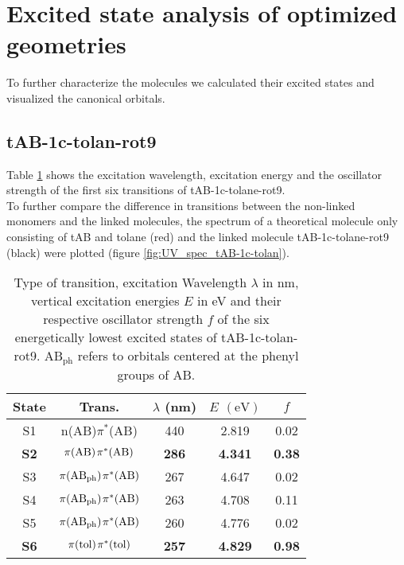 \section{Excited state analysis of optimized geometries}
To further characterize the molecules we calculated their excited states and visualized the canonical orbitals. \\
%
\subsection{tAB-1c-tolan-rot9}
%
Table \ref{tab:excited_states_tAB_1c_tolan} shows the excitation wavelength, excitation energy and the oscillator strength of the first six transitions of tAB-1c-tolane-rot9. \\
To further compare the difference in transitions between the non-linked monomers and the linked molecules, the spectrum of a theoretical molecule only consisting of tAB and tolane (red) and the linked molecule tAB-1c-tolane-rot9 (black) were plotted (figure \ref{fig:UV_spec_tAB-1c-tolan}).
%
\begin{table}[H]
\caption{Type of transition, excitation Wavelength $\lambda$ in nm, vertical excitation energies $E$ in eV and their respective oscillator strength $f$ of the six energetically lowest excited states of tAB-1c-tolan-rot9. $\mathrm{AB_{ph}}$ refers to orbitals centered at the phenyl groups of AB.}
\label{tab:excited_states_tAB_1c_tolan}
\vspace{0.1 cm}
\centering
\begin{tabular}{ccccc}
\toprule
State & Trans. & $\lambda$ (nm)     & $E$ $\left(\si{\eV}\right)$          & $f$                 \\ \midrule
S1 & n(AB)$\pi^{*}$(AB)  & 440   & 2.819 & 0.02                \\
\textbf{S2}    & $\pi\mathrm{(AB)}\hspace{1 pt} \pi^{*}\mathrm{(AB)}$   & \textbf{286} & \textbf{4.341} & \textbf{0.38} \\
S3    & $\pi\mathrm{(AB_{ph})}\hspace{1 pt} \pi^{*}\mathrm{(AB)}$& 267 & 4.647 & 0.02                \\
S4    & $\pi\mathrm{(AB_{ph})} \hspace{1 pt} \pi^{*}\mathrm{(AB)}$& 263 & 4.708 & 0.11                \\
S5    & $\pi\mathrm{(AB_{ph})} \hspace{1 pt} \pi^{*}\mathrm{(AB)}$& 260 & 4.776 & 0.02                \\
\textbf{S6} & $\pi\mathrm{(tol)} \hspace{1 pt} \pi^{*}\mathrm{(tol)}$& \textbf{257} & \textbf{4.829} & \textbf{0.98}       \\ \bottomrule
\end{tabular}
\end{table}
